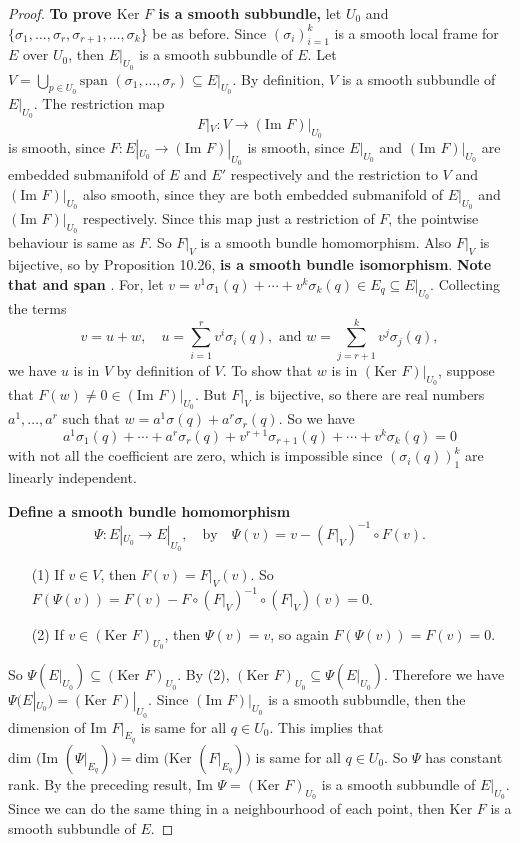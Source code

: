 \documentclass[a4paper]{article}
\theoremstyle{remark}
\newcommand{\subhim}{\subseteq} %
\begin{document}
\begin{proof}
\textbf{To prove $\text{Ker }F$ is a smooth subbundle,} let $U_0$ and $\{\sigma_1,\dots,\sigma_r,\sigma_{r+1},\dots,\sigma_k\}$ be as before. Since $(\sigma_i)_{i=1}^k$ is a smooth local frame for $E$ over $U_0$, then $E|_{U_0}$ is a smooth subbundle of $E$. Let $V = \bigcup_{p \in U_0} \text{span }(\sigma_1,\dots,\sigma_r) \subhim E|_{U_0}$. By definition, $V$ is a smooth subbundle of $E|_{U_0}$. The restriction map
$$
F|_V : V \to (\text{Im }F)|_{U_0}
$$
is smooth, since $F : E|_{U_0} \to (\text{Im }F)|_{U_0}$ is smooth, since $E|_{U_0}$ and $ (\text{Im }F)|_{U_0}$ are embedded submanifold of $E$ and $E'$ respectively and  the restriction to  $V$ and $(\text{Im }F)|_{U_0}$ also smooth, since they are both embedded submanifold of $E|_{U_0}$ and $ (\text{Im }F)|_{U_0}$ respectively. Since this map just a restriction of $F$, the pointwise behaviour is same as $F$. So $F|_V$ is a smooth bundle homomorphism. Also $F|_V$ is bijective, so by Proposition 10.26, \textbf{ is a smooth bundle isomorphism}. \textbf{Note that  and  span }. For, let $v=v^1\sigma_1(q)+\cdots + v^k \sigma_k(q) \in E_q \subhim E|_{U_0}$. Collecting the terms
$$
v = u+w, \quad  u=\sum_{i=1}^{r} v^i \sigma_i(q), \text{ and } w=\sum_{j=r+1}^{k}v^j \sigma_j(q),
$$
we have $u$ is in $V$ by definition of $V$. To show that $w$ is in $(\text{Ker }F)|_{U_0}$, suppose that $F(w) \neq 0 \in (\text{Im }F)|_{U_0}$. But $F|_V$ is bijective, so there are real numbers $a^1,\dots,a^r$ such that $w = a^1\sigma(q) + a^r\sigma_r(q)$. So we have 
$$
a^1\sigma_1(q)+ \cdots + a^r \sigma_r(q) + v^{r+1}\sigma_{r+1}(q) + \cdots +v^k\sigma_k(q) = 0
$$
with not all the coefficient are zero, which is impossible since $(\sigma_i(q))_{1}^k$ are linearly independent.

\textbf{Define a smooth bundle homomorphism}
$$
\Psi : E|_{U_0} \to E|_{U_0}, \quad \text{by} \quad \Psi (v) = v- (F|_V)^{-1} \circ F(v). 
$$
\begin{enumerate}
\item[(1)] If $v \in V$, then $F(v) = F|_{V}(v)$. So $F(\Psi(v)) = F(v) - F \circ (F|_V)^{-1} \circ (F|_V)(v) = 0$.
\item[(2)] If $v \in (\text{Ker }F)_{U_0}$, then $\Psi(v) = v$, so again $F(\Psi(v)) = F(v) = 0$.
\end{enumerate}
So $\Psi ( E|_{U_0}) \subhim (\text{Ker }F)_{U_0}$. By (2), $(\text{Ker }F)_{U_0} \subhim \Psi ( E|_{U_0})$. Therefore we have $\Psi ( E|_{U_0}) = (\text{Ker }F)|_{U_0}$. Since $(\text{Im }F)|_{U_0}$ is a smooth subbundle, then the dimension of $\text{Im }F|_{E_q}$ is same for all $q \in U_0$. This implies that $\text{dim }\big(\text{Im }(\Psi|_{E_q}) \big) = \text{dim }\big(\text{Ker }(F|_{E_q}) \big)$ is same for all $q \in U_0$. So $\Psi$ has constant rank. By the preceding result, $\text{Im }\Psi = (\text{Ker }F)_{U_0}$ is a smooth subbundle of $E|_{U_0}$. Since we can do the same thing in a neighbourhood of each point, then $\text{Ker }F$ is a smooth subbundle of $E$.
\end{proof}
\end{document}

